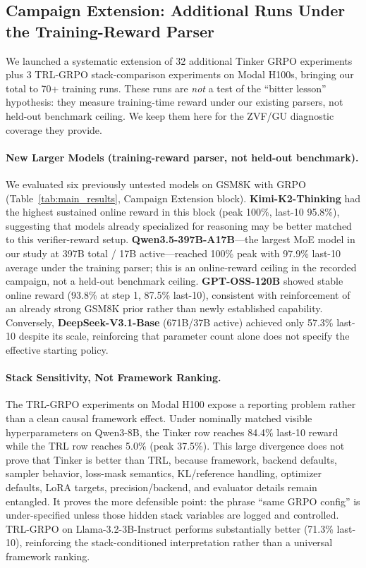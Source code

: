 \documentclass{article}
\begin{document}
\subsection{Campaign Extension: Additional Runs Under the Training-Reward Parser}
\label{sec:bitter_lesson}

We launched a systematic extension of 32 additional Tinker GRPO experiments
plus 3 TRL-GRPO stack-comparison experiments on Modal H100s, bringing our
total to 70+ training runs.  These runs are \emph{not} a test of the ``bitter
lesson'' hypothesis: they measure training-time reward under our existing
parsers, not held-out benchmark ceiling.  We keep them here for the ZVF/GU diagnostic
coverage they provide.

\paragraph{New Larger Models (training-reward parser, not held-out benchmark).}
We evaluated six previously untested models on GSM8K with GRPO (Table~\ref{tab:main_results}, Campaign Extension block).
\textbf{Kimi-K2-Thinking} had the highest sustained online reward in this block
(peak 100\%, last-10 95.8\%), suggesting that models already specialized for
reasoning may be better matched to this verifier-reward setup.
\textbf{Qwen3.5-397B-A17B}---the largest MoE model in our study at 397B total /
17B active---reached 100\% peak with 97.9\% last-10 average under
the training parser; this is an online-reward ceiling in the recorded campaign,
not a held-out benchmark ceiling. \textbf{GPT-OSS-120B} showed stable online
reward (93.8\% at step 1, 87.5\% last-10), consistent with reinforcement of an
already strong GSM8K prior rather than newly established capability. Conversely,
\textbf{DeepSeek-V3.1-Base} (671B/37B active) achieved only 57.3\% last-10
despite its scale, reinforcing that parameter count alone does not specify the
effective starting policy.

\paragraph{Stack Sensitivity, Not Framework Ranking.}
The TRL-GRPO experiments on Modal H100 expose a reporting problem rather than
a clean causal framework effect.  Under nominally matched visible
hyperparameters on Qwen3-8B, the Tinker row reaches 84.4\% last-10 reward while the TRL row reaches
5.0\% (peak 37.5\%).  This large divergence does not prove that Tinker is
better than TRL, because framework, backend defaults, sampler behavior,
loss-mask semantics, KL/reference handling, optimizer defaults, LoRA targets, precision/backend,
and evaluator details remain entangled.  It proves the more defensible point:
the phrase ``same GRPO config'' is under-specified unless those hidden stack
variables are logged and controlled.  TRL-GRPO on Llama-3.2-3B-Instruct performs
substantially better (71.3\% last-10), reinforcing the stack-conditioned
interpretation rather than a universal framework ranking.
\end{document}
